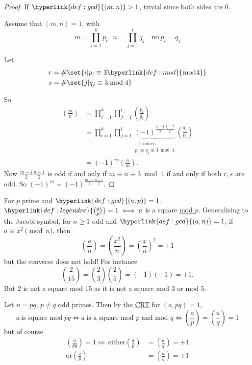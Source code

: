 \documentclass{article}
\newcommand{\legendre}[2]{\genfrac{(}{)}{}{}{#1}{#2}}
\begin{document}
\begin{proof}
    If $\hyperlink{def:gcd}{(m, n)} > 1$, trivial since both sides are 0.

    Assume that $(m, n) = 1$, with
    \begin{equation*}
        m = \prod_{i=1}^k p_i , \; n = \prod_{j=1}^l q_j \quad \text{no} \ p_i = q_j
    \end{equation*}

    Let
    \begin{align*}
        r &= \# \set{i | p_i \equiv 3 \hyperlink{def:mod}{\bmod{4}}} \\
        s &= \# \set{j | q_j \equiv 3 \bmod{4}}
    \end{align*}

    So
    \begin{align*}
        \legendre{m}{n} &= \prod_{i=1}^k \prod_{j=1}^l \legendre{p_i}{q_j} \\
                        &= \prod_{i=1}^k \prod_{j=1}^l \underbrace{(-1)^{\frac{p_i-1}{2}\frac{q_j-1}{2}}}_{\substack{+1 \text{ unless } \\p_i \equiv q_j \equiv 3 \bmod{4}}} \legendre{q_j}{p_i} \\
                        &= (-1)^{rs} \legendre{n}{m}.
    \end{align*}
    Now $\frac{m-1}{2}\frac{n-1}{2}$ is odd if and only if $m \equiv n \equiv 3 \bmod{4}$ if and only if both $r, s$ are odd.
    So $(-1)^{rs} = (-1)^{\frac{m-1}{2}\frac{n-1}{2}}$.
\end{proof}

For $p$ prime and $\hyperlink{def:gcd}{(a, p)} = 1$, $\hyperlink{def:legendre}{\legendre{a}{p}} = 1 \iff a$ is a square \hyperlink{def:mod}{mod $p$}.
Generalising to the Jacobi symbol, for $n \geq 1$ odd and $\hyperlink{def:gcd}{(a, n)} = 1$, if $a \equiv x^2 \pmod{n}$, then
\begin{equation*}
    \legendre{a}{n} = \legendre{x^2}{n} = \legendre{x}{n}^2 = +1
\end{equation*}
but the converse does not hold! For instance
\begin{equation*}
    \legendre{2}{15} = \legendre{2}{3} \legendre{2}{5} = (-1) (-1) = +1.
\end{equation*}
But $2$ is not a square mod $15$ as it is not a square mod $3$ or mod $5$.

Let $n = pq$, $p \neq q$ odd primes. Then by the \hyperlink{thm:crt}{CRT} for $(a, pq) = 1$,
\begin{equation*}
    a \ \text{is square mod} \ pq \iff a \ \text{is a square mod $p$ and mod $q$} \iff \legendre{a}{p} = \legendre{a}{q} = 1
\end{equation*}
but of course
\begin{align*}
    \legendre{a}{pq} = 1 \iff \ \text{either} \legendre{a}{p} &= \legendre{a}{q} = +1 \\
        \text{or} \legendre{a}{p} &= \legendre{a}{q} = +1
\end{align*}
\end{document}
